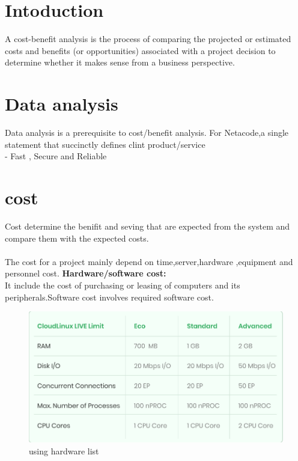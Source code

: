 \documentclass[a4paper,12pt]{report}
\begin{document}
\section{Intoduction}
A cost-benefit analysis is the process of comparing the projected or estimated costs and benefits (or opportunities) associated with a project decision to determine whether it makes sense from a business perspective.\\
\section{Data analysis}
Data analysis is a prerequisite to cost/benefit analysis. For Netacode,a single statement that succinctly defines clint product/service\\
- Fast , Secure and Reliable
\section{cost}
Cost determine the benifit and seving that are expected from the system and compare them with the expected costs.\\
\\The cost for a project mainly depend on time,server,hardware ,equipment and personnel cost.
\subitem \textbf{Hardware/software cost:\\}It include the cost of purchasing or leasing of computers and its peripherals.Software cost involves required software cost.

\begin{figure}[h]
	\centering
	\includegraphics[width=0.7\linewidth]{7_2}
	\caption{using hardware list}
	\label{fig:72}
\end{figure}
\end{document}
